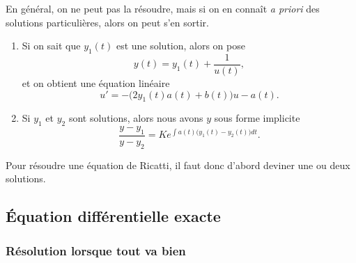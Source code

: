 En général, on ne peut pas la résoudre, mais si on en connaît \emph{a priori} des solutions particulières, alors on peut s'en sortir.

\begin{enumerate}

\item
Si on sait que $y_1(t)$ est une solution, alors on pose
\begin{equation}
	y(t)=y_1(t)+\frac{1}{ u(t) },
\end{equation}
et on obtient une équation linéaire
\begin{equation}
	u'=-\big( 2y_1(t)a(t)+b(t) \big)u-a(t).
\end{equation}

\item
Si $y_1$ et $y_2$ sont solutions, alors nous avons $y$ sous forme implicite
\begin{equation}
	\frac{ y-y_1 }{ y-y_2 }=K e^{\int a(t)\big( y_1(t)-y_2(t) \big)dt}.
\end{equation}
\end{enumerate}

Pour résoudre une équation de Ricatti, il faut donc d'abord deviner une ou deux solutions.

					\subsection{Équation différentielle exacte}
\label{SubSecEqDiffExacte}

					\subsubsection{Résolution lorsque tout va bien}

